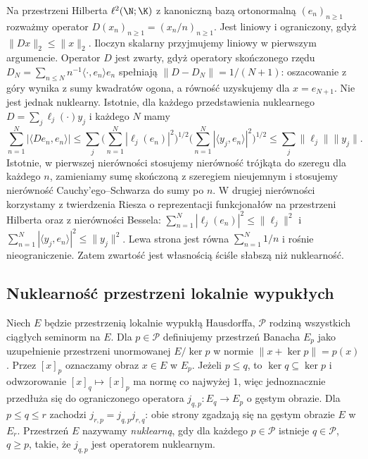 \begin{przyklad}
\label{ex:compact-nonnuclear23}
Na przestrzeni Hilberta $\ell^2(\N;\K)$ z kanoniczną
bazą ortonormalną $(e_n)_{n\ge1}$ rozważmy operator
$D(x_n)_{n\ge1}=(x_n/n)_{n\ge1}$. Jest liniowy i
ograniczony, gdyż $\|Dx\|_2\le\|x\|_2$.
Iloczyn skalarny przyjmujemy liniowy w pierwszym argumencie.
Operator $D$ jest zwarty, gdyż operatory skończonego rzędu
$D_N=\sum_{n\le N}n^{-1}\langle\cdot,e_n\rangle e_n$
spełniają $\|D-D_N\|=1/(N+1)$:
oszacowanie z góry wynika z sumy kwadratów ogona,
a równość uzyskujemy dla $x=e_{N+1}$. Nie jest jednak
nuklearny. Istotnie, dla każdego przedstawienia nuklearnego
$D=\sum_j\ell_j(\cdot)y_j$ i każdego $N$ mamy
\[
\sum_{n=1}^N|\langle De_n,e_n\rangle|
\le\sum_j
\Big(\sum_{n=1}^N|\ell_j(e_n)|^2\Big)^{1/2}
\Big(\sum_{n=1}^N|\langle y_j,e_n\rangle|^2\Big)^{1/2}
\le\sum_j\|\ell_j\|\|y_j\|.
\]
Istotnie, w pierwszej nierówności stosujemy nierówność
trójkąta do szeregu dla każdego $n$, zamieniamy sumę
skończoną z szeregiem nieujemnym i stosujemy nierówność
Cauchy'ego--Schwarza do sumy po $n$. W drugiej nierówności
korzystamy z twierdzenia Riesza o reprezentacji funkcjonałów
na przestrzeni Hilberta oraz z nierówności Bessela:
$\sum_{n=1}^N|\ell_j(e_n)|^2\le\|\ell_j\|^2$ i
$\sum_{n=1}^N|\langle y_j,e_n\rangle|^2\le\|y_j\|^2$.
Lewa strona jest równa $\sum_{n=1}^N1/n$ i rośnie
nieograniczenie. Zatem zwartość jest własnością ściśle
słabszą niż nuklearność.
\end{przyklad}

\subsection{Nuklearność przestrzeni lokalnie wypukłych}

\begin{definicja}
\label{def:nuclear-lcs23}
Niech $E$ będzie przestrzenią lokalnie wypukłą Hausdorffa,
$\mathcal P$ rodziną wszystkich ciągłych seminorm na $E$.
Dla $p\in\mathcal P$ definiujemy przestrzeń Banacha $E_p$
jako uzupełnienie przestrzeni unormowanej $E/\ker p$
w normie $\|x+\ker p\|=p(x)$.
Przez $[x]_p$ oznaczamy obraz $x\in E$ w $E_p$.
Jeżeli $p\le q$, to $\ker q\subseteq\ker p$ i
odwzorowanie $[x]_q\mapsto[x]_p$ ma normę co najwyżej $1$,
więc jednoznacznie przedłuża się do ograniczonego operatora
$j_{q,p}:E_q\to E_p$ o gęstym obrazie.
Dla $p\le q\le r$ zachodzi $j_{r,p}=j_{q,p}j_{r,q}$:
obie strony zgadzają się na gęstym obrazie $E$ w $E_r$.
Przestrzeń $E$ nazywamy \emph{nuklearną}, gdy dla każdego
$p\in\mathcal P$ istnieje $q\in\mathcal P$, $q\ge p$,
takie, że $j_{q,p}$ jest operatorem nuklearnym.
\end{definicja}

